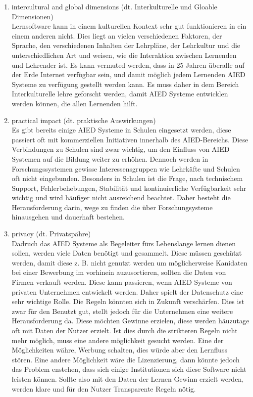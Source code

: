 \begin{enumerate}
    \item intercultural and global dimensions (dt. Interkulturelle und Gloable Dimensionen) \\ 
    Lernsoftware kann in einem kulturellen Kontext sehr gut funktionieren in ein einem anderen nicht. Dies liegt an vielen verschiedenen Faktoren, der Sprache, den verschiedenen Inhalten der Lehrpläne,
    der Lehrkultur und die unterschiedlichen Art und weisen, wie die Interaktion zwischen Lernenden und Lehrender ist. Es kann vermuted werden, dass in 25 Jahren überalle auf der Erde Internet verfügbar sein,
    und damit möglich jedem Lernenden AIED Systeme zu verfügung gestellt werden kann. Es muss daher in dem Bereich Interkulturelle lehre geforscht werden, damit AIED Systeme entwicklen werden können, die allen Lernenden hilft. 
    
    \item practical impact (dt. praktische Auswirkungen) \\
    Es gibt bereits einige AIED Systeme in Schulen eingesetzt werden, diese passiert oft mit kommerziellen Initiativen innerhalb des AIED-Bereichs.
    Diese Verbindungen zu Schulen sind zwar wichtig, um den Einfluss von AIED Systemen auf die Bildung weiter zu erhöhen. Dennoch werden in Forschungssystemen gewisse Interessensgruppen wie Lehrkäfte und Schulen oft nicht eingebunden.
    Besonders in Schulen ist die Frage, nach technischem Support, Fehlerbehebungen, Stabilität und kontinuierliche Verfügbarkeit sehr wichtig und wird häufiger nicht ausreichend beachtet. 
    Daher besteht die Herausforderung darin, wege zu finden die über Forschungsysteme hinausgehen und dauerhaft bestehen.

    \item privacy (dt. Privatspähre) \\
    Dadruch das AIED Systeme als Begeleiter fürs Lebenslange lernen dienen sollen, werden viele Daten benötigt und gesammelt.
    Diese müssen geschützt werden, damit diese z. B. nicht genutzt werden um möglicherweise Kanidaten bei einer Bewerbung im vorhinein auzusortieren, sollten die Daten von Firmen verkauft werden.
    Diese kann passieren, wenn AIED Systeme von privaten Unternehmen entwickelt werden. Daher spielt der Datenschutz eine sehr wichtige Rolle. Die Regeln könnten sich in Zukunft verschärfen.
    Dies ist zwar für den Benutzt gut, stellt jedoch für die Unternehmen eine weitere Herausforderung da. Diese möchten Gewinne erzielen, diese werden häuzutage oft mit Daten der Nutzer erzielt.
    Ist dies durch die strikteren Regeln nicht mehr möglich, muss eine andere möglichkeit gesucht werden. Eine der Möglichkeiten währe, Werbung schalten, dies würde aber den Lernfluss stören.
    Eine andere Möglichkeit wäre die Lizenzierung, dann könnte jedoch das Problem enstehen, dass sich einige Institutionen sich diese Software nicht leisten können.
    Sollte also mit den Daten der Lernen Gewinn erzielt werden, werden klare und für den Nutzer Transparente Regeln nötig.


\end{enumerate}
